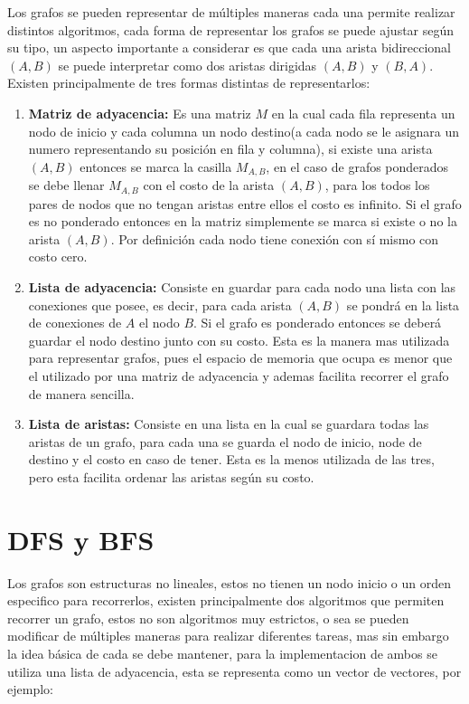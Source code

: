 \documentclass[12pt, a4paper]{article}
\begin{document}
	Los grafos se pueden representar de múltiples maneras cada una permite realizar distintos algoritmos, cada forma 
	de representar los grafos se puede ajustar según su tipo, un aspecto importante a considerar es que cada una arista
	bidireccional $(A,B)$ se puede interpretar como dos aristas dirigidas $(A,B)$ y $(B,A)$. Existen principalmente de
	tres formas distintas de representarlos:
	
	\begin{enumerate}[1.]
		\item \textbf{Matriz de adyacencia:} Es una matriz $M$ en la cual cada fila representa un nodo de inicio y cada
			columna un nodo destino(a cada nodo se le asignara un numero representando su posición en fila y columna), 
			si existe una arista $(A,B)$ entonces se marca la casilla $M_{A,B}$, en el caso de grafos ponderados se
			debe llenar $M_{A,B}$ con el costo de la arista $(A,B)$, para los todos los pares de nodos que no tengan
			aristas entre ellos el costo es infinito. Si el grafo es no ponderado entonces en la matriz simplemente se
			marca si existe o no la arista $(A,B)$. Por definición cada nodo tiene conexión con sí mismo con costo cero.
		\item \textbf{Lista de adyacencia:} Consiste en guardar para cada nodo una lista con las conexiones que posee,
		 	es decir, para cada arista $(A,B)$ se pondrá en la lista de conexiones de $A$ el nodo $B$. Si el grafo es
		 	ponderado entonces se deberá guardar el nodo destino junto con su costo. Esta es la manera mas utilizada 
		 	para representar grafos, pues el espacio de memoria que ocupa es menor que el utilizado por una matriz de
		 	adyacencia y ademas facilita recorrer el grafo de manera sencilla.
		\item \textbf{Lista de aristas:} Consiste en una lista en la cual se guardara todas las aristas de un grafo, 
			para cada una se guarda el nodo de inicio, node de destino y el costo en caso de tener. Esta es la menos
			 utilizada de las tres, pero esta facilita ordenar las aristas según su costo.
	\end{enumerate}
	
	\section{DFS y BFS}
	
	Los grafos son estructuras no lineales, estos no tienen un nodo inicio o un orden especifico para recorrerlos,
	existen principalmente dos algoritmos que permiten recorrer un grafo, estos no son algoritmos muy estrictos, o 
	sea se pueden modificar de múltiples maneras para realizar diferentes tareas, mas sin embargo la idea básica de
	cada se debe mantener, para la implementacion de ambos se utiliza una lista de adyacencia, esta se representa como 
	un vector de vectores, por ejemplo:
	
\end{document}
